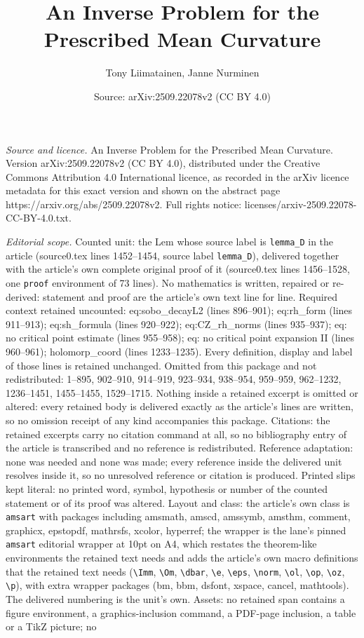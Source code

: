\documentclass[10pt,a4paper]{amsart}
\title[An Inverse Problem for the Prescribed Mean Curvature]{An Inverse Problem for the Prescribed Mean Curvature}
\author{Tony Liimatainen, Janne Nurminen}
\date{Source: arXiv:2509.22078v2 (CC BY 4.0)}
\begin{document}
\maketitle

\noindent\emph{Source and licence.} An Inverse Problem for the Prescribed Mean Curvature. Version arXiv:2509.22078v2 (CC BY 4.0), distributed under the Creative Commons Attribution 4.0 International licence, as recorded in the arXiv licence metadata for this exact version and shown on the abstract page https://arxiv.org/abs/2509.22078v2. Full rights notice: licenses/arxiv-2509.22078-CC-BY-4.0.txt.\par\smallskip

\noindent\textit{Editorial scope.} Counted unit: the Lem whose source label is \texttt{lemma\_D} in the article (source0.tex lines 1452--1454, source label \texttt{lemma\_D}), delivered together with the article's own complete original proof of it (source0.tex lines 1456--1528, one \texttt{proof} environment of 73 lines). No mathematics is written, repaired or re-derived: statement and proof are the article's own text line for line. Required context retained uncounted: eq:sobo\_decayL2 (lines 896--901); eq:rh\_form (lines 911--913); eq:sh\_formula (lines 920--922); eq:CZ\_rh\_norms (lines 935--937); eq: no critical point estimate (lines 955--958); eq: no critical point expansion II (lines 960--961); holomorp\_coord (lines 1233--1235). Every definition, display and label of those lines is retained unchanged. Omitted from this package and not redistributed: 1--895, 902--910, 914--919, 923--934, 938--954, 959--959, 962--1232, 1236--1451, 1455--1455, 1529--1715. Nothing inside a retained excerpt is omitted or altered: every retained body is delivered exactly as the article's lines are written, so no omission receipt of any kind accompanies this package. Citations: the retained excerpts carry no citation command at all, so no bibliography entry of the article is transcribed and no reference is redistributed. Reference adaptation: none was needed and none was made; every reference inside the delivered unit resolves inside it, so no unresolved reference or citation is produced. Printed slips kept literal: no printed word, symbol, hypothesis or number of the counted statement or of its proof was altered. Layout and class: the article's own class is \texttt{amsart} with packages including amsmath, amscd, amssymb, amsthm, comment, graphicx, epstopdf, mathrsfs, xcolor, hyperref; the wrapper is the lane's pinned \texttt{amsart} editorial wrapper at 10pt on A4, which restates the theorem-like environments the retained text needs and adds the article's own macro definitions that the retained text needs (\texttt{\textbackslash Imm}, \texttt{\textbackslash Om}, \texttt{\textbackslash dbar}, \texttt{\textbackslash e}, \texttt{\textbackslash eps}, \texttt{\textbackslash norm}, \texttt{\textbackslash ol}, \texttt{\textbackslash op}, \texttt{\textbackslash oz}, \texttt{\textbackslash p}), with extra wrapper packages (bm, bbm, dsfont, xspace, cancel, mathtools). The delivered numbering is the unit's own. Assets: no retained span contains a figure environment, a graphics-inclusion command, a PDF-page inclusion, a table or a TikZ picture; no 
\end{document}
